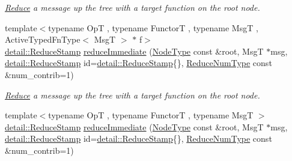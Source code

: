 \begin{DoxyCompactItemize}
\begin{DoxyCompactList}\small\item\em \hyperlink{structvt_1_1collective_1_1reduce_1_1_reduce}{Reduce} a message up the tree with a target function on the root node. \end{DoxyCompactList}\item 
{\footnotesize template$<$typename OpT , typename FunctorT , typename MsgT , Active\+Typed\+Fn\+Type$<$ Msg\+T $>$ $\ast$ f$>$ }\\\hyperlink{namespacevt_1_1collective_1_1reduce_1_1detail_abcd205dec83706f347d55c7528bf2664}{detail\+::\+Reduce\+Stamp} \hyperlink{structvt_1_1collective_1_1reduce_1_1_reduce_a80589266a6fc802458c56cfe8f90679d}{reduce\+Immediate} (\hyperlink{namespacevt_a866da9d0efc19c0a1ce79e9e492f47e2}{Node\+Type} const \&root, MsgT $\ast$msg, \hyperlink{namespacevt_1_1collective_1_1reduce_1_1detail_abcd205dec83706f347d55c7528bf2664}{detail\+::\+Reduce\+Stamp} id=\hyperlink{namespacevt_1_1collective_1_1reduce_1_1detail_abcd205dec83706f347d55c7528bf2664}{detail\+::\+Reduce\+Stamp}\{\}, \hyperlink{structvt_1_1collective_1_1reduce_1_1_reduce_a6c3e63aca10c31d2823b0b18cf9762a4}{Reduce\+Num\+Type} const \&num\+\_\+contrib=1)
\begin{DoxyCompactList}\small\item\em \hyperlink{structvt_1_1collective_1_1reduce_1_1_reduce}{Reduce} a message up the tree with a target function on the root node. \end{DoxyCompactList}\item 
{\footnotesize template$<$typename OpT , typename FunctorT , typename MsgT $>$ }\\\hyperlink{namespacevt_1_1collective_1_1reduce_1_1detail_abcd205dec83706f347d55c7528bf2664}{detail\+::\+Reduce\+Stamp} \hyperlink{structvt_1_1collective_1_1reduce_1_1_reduce_abbd6473db94374257fa0bf66d994d549}{reduce\+Immediate} (\hyperlink{namespacevt_a866da9d0efc19c0a1ce79e9e492f47e2}{Node\+Type} const \&root, MsgT $\ast$msg, \hyperlink{namespacevt_1_1collective_1_1reduce_1_1detail_abcd205dec83706f347d55c7528bf2664}{detail\+::\+Reduce\+Stamp} id=\hyperlink{namespacevt_1_1collective_1_1reduce_1_1detail_abcd205dec83706f347d55c7528bf2664}{detail\+::\+Reduce\+Stamp}\{\}, \hyperlink{structvt_1_1collective_1_1reduce_1_1_reduce_a6c3e63aca10c31d2823b0b18cf9762a4}{Reduce\+Num\+Type} const \&num\+\_\+contrib=1)
\item 

\end{DoxyCompactItemize}
